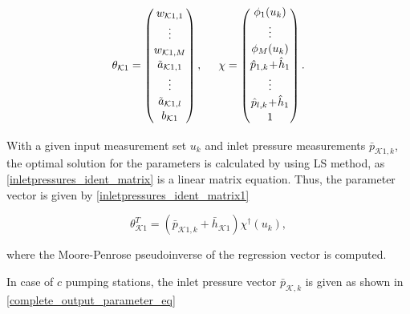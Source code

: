   \begin{equation}
\label{par_regr_matrix}
\theta_{\mathcal{K}1} = 
          \begin{pmatrix}
           w_{\mathcal{K}1,1}  \\[1pt]
           \vdots  \\[1pt]
           w_{\mathcal{K}1,M}  \\[1pt]
           \tilde{a}_{\mathcal{K}1,1} \\[1pt]
           \vdots \\[1pt]
           \tilde{a}_{\mathcal{K}1,l} \\[1pt]
           b_{\mathcal{K}1} \\[1pt]
         \end{pmatrix}
         ,
         \hspace{5mm}
         \chi = 
         \begin{pmatrix}
           \phi_{1}(u_k)  \\[1pt]
           \vdots  \\[1pt]
           \phi_{M}(u_k)  \\[1pt]
           \hat{p}_{1,k} \!+ \!\hat{h}_1 \\[1pt]
           \vdots  \\[1pt]
           \hat{p}_{l,k} \!+ \!\hat{h}_1 \\[1pt]
           1 \\[1pt]
         \end{pmatrix}.
\end{equation}

With a given input measurement set $u_k$ and inlet pressure measurements $\bar{p}_{\mathcal{K}1,k}$, the optimal solution for the parameters is calculated by using LS method, as \eqref{inletpressures_ident_matrix} is a linear matrix equation. Thus, the parameter vector is given by \eqref{inletpressures_ident_matrix1}

  \begin{equation}
\label{inletpressures_ident_matrix1}
 \theta^T_{\mathcal{K}1} = (\bar{p}_{\mathcal{K}1,k} + \bar{h}_{\mathcal{K}1}) \chi^{\dagger}(u_k), 
\end{equation}

where the Moore-Penrose pseudoinverse of the regression vector is computed.  

\newpage

In case of $c$ pumping stations, the inlet pressure vector $\bar{p}_{\mathcal{K},k}$ is given as shown in \eqref{complete_output_parameter_eq}

